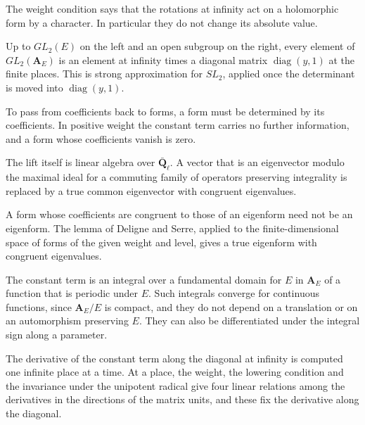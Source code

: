 The weight condition says that the rotations at infinity act on a holomorphic form by a character. In particular they do not change its absolute value.

Up to $GL_2(E)$ on the left and an open subgroup on the right, every element of $GL_2(\mathbf A_E)$ is an element at infinity times a diagonal matrix $\operatorname{diag}(y,1)$ at the finite places. This is strong approximation for $SL_2$, applied once the determinant is moved into $\operatorname{diag}(y,1)$.

To pass from coefficients back to forms, a form must be determined by its coefficients. In positive weight the constant term carries no further information, and a form whose coefficients vanish is zero.

The lift itself is linear algebra over $\bar{\mathbf Q}_\ell$. A vector that is an eigenvector modulo the maximal ideal for a commuting family of operators preserving integrality is replaced by a true common eigenvector with congruent eigenvalues.

A form whose coefficients are congruent to those of an eigenform need not be an eigenform. The lemma of Deligne and Serre, applied to the finite-dimensional space of forms of the given weight and level, gives a true eigenform with congruent eigenvalues.

The constant term is an integral over a fundamental domain for $E$ in $\mathbf A_E$ of a function that is periodic under $E$. Such integrals converge for continuous functions, since $\mathbf A_E/E$ is compact, and they do not depend on a translation or on an automorphism preserving $E$. They can also be differentiated under the integral sign along a parameter.

The derivative of the constant term along the diagonal at infinity is computed one infinite place at a time. At a place, the weight, the lowering condition and the invariance under the unipotent radical give four linear relations among the derivatives in the directions of the matrix units, and these fix the derivative along the diagonal.


